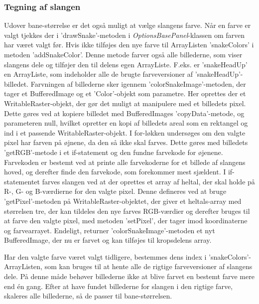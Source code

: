 \subsubsection{Tegning af slangen}
Udover bane-størrelse er det også muligt at vælge slangens farve. Når en farve er valgt tjekkes der i 'drawSnake'-metoden i \textit{OptionsBasePanel}-klassen om farven har været valgt før. Hvis ikke tilføjes den nye farve til ArrayListen 'snakeColors' i metoden 'addSnakeColor'. Denne metode farver også alle billederne, som viser slangens dele og tilføjer den til delens egen ArrayListe. F.eks. er 'snakeHeadUp' en ArrayListe, som indeholder alle de brugte farveversioner af 'snakeHeadUp'-billedet. Farvningen af billederne sker igennem 'colorSnakeImage'-metoden, der tager et BufferedImage og et 'Color'-objekt som parametre. Her oprettes der et WritableRaster-objekt, der gør det muligt at manipulere med et billedets pixel. Dette gøres ved at kopiere billedet med BufferedImages 'copyData'-metode, og parameteren null, hvilket opretter en kopi af billedets areal som en rektangel og ind i et passende WritableRaster-objekt. I for-løkken undersøges om den valgte pixel har farven på øjnene, da den så ikke skal farves. Dette gøres med billedets 'getRGB'-metode i et if-statement og den fundne farvekode for øjenene. Farvekoden er bestemt ved at printe alle farvekoderne for et billede af slangens hoved, og derefter finde den farvekode, som forekommer mest sjældent. I if-statementet farves slangen ved at der oprettes et array af heltal, der skal holde på R-, G- og B-værdierne for den valgte pixel. Denne defineres ved at bruge 'getPixel'-metoden på WritableRaster-objektet, der giver et heltals-array med størrelsen tre, der kan tildeles den nye farves RGB-værdier og derefter bruges til at farve den valgte pixel, med metoden 'setPixel', der tager imod koordinaterne og farvearrayet. Endeligt, returner 'colorSnakeImage'-metoden et nyt BufferedImage, der nu er farvet og kan tilføjes til kropsdelens array.
\linebreak

Har den valgte farve været valgt tidligere, bestemmes dens index i 'snakeColors'-ArrayListen, som kan bruges til at hente alle de rigtige farveversioner af slangens dele. På denne måde behøver billederne ikke at blive farvet en bestemt farve mere end én gang. Efter at have fundet billederne for slangen i den rigtige farve, skaleres alle billederne, så de passer til bane-størrelsen. 
\linebreak

